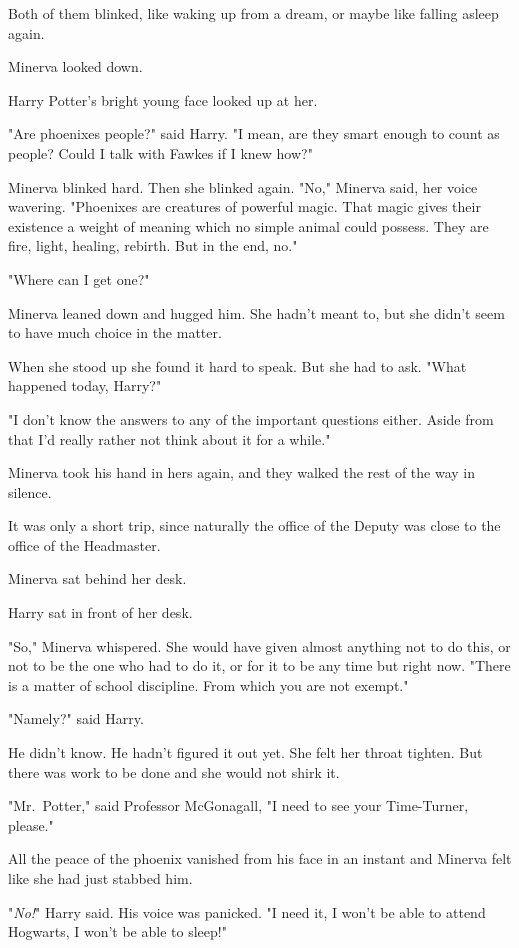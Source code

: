Both of them blinked, like waking up from a dream, or maybe like falling asleep
again.

Minerva looked down.

Harry Potter's bright young face looked up at her.

"Are phoenixes people?" said Harry. "I mean, are they smart enough to count as
people? Could I talk with Fawkes if I knew how?"

Minerva blinked hard. Then she blinked again. "No," Minerva said, her voice
wavering. "Phoenixes are creatures of powerful magic. That magic gives their
existence a weight of meaning which no simple animal could possess. They are
fire, light, healing, rebirth. But in the end, no."

"Where can I get one?"

Minerva leaned down and hugged him. She hadn't meant to, but she didn't seem to
have much choice in the matter.

When she stood up she found it hard to speak. But she had to ask. "What
happened today, Harry?"

"I don't know the answers to any of the important questions either. Aside from
that I'd really rather not think about it for a while."

Minerva took his hand in hers again, and they walked the rest of the way in
silence.

It was only a short trip, since naturally the office of the Deputy was close to
the office of the Headmaster.

Minerva sat behind her desk.

Harry sat in front of her desk.

"So," Minerva whispered. She would have given almost anything not to do this,
or not to be the one who had to do it, or for it to be any time but right now.
"There is a matter of school discipline. From which you are not exempt."

"Namely?" said Harry.

He didn't know. He hadn't figured it out yet. She felt her throat tighten. But
there was work to be done and she would not shirk it.

"Mr.~Potter," said Professor McGonagall, "I need to see your Time-Turner,
please."

All the peace of the phoenix vanished from his face in an instant and Minerva
felt like she had just stabbed him.

"\emph{No!}" Harry said. His voice was panicked. "I need it, I won't be able to
attend Hogwarts, I won't be able to sleep!"

